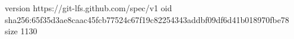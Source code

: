 version https://git-lfs.github.com/spec/v1
oid sha256:65f35d3ae8caac45fcb77524c67f19c82254343addbf09df6d41b018970fbe78
size 1130
